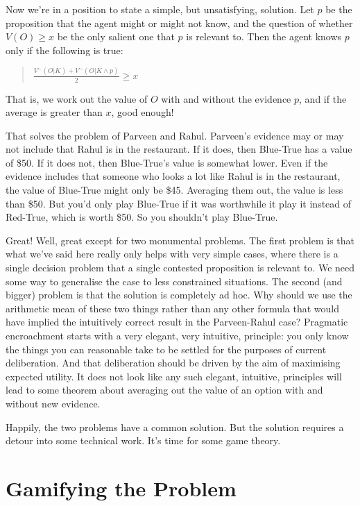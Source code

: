 \documentclass{article}
\begin{document}
Now we're in a position to state a simple, but unsatisfying, solution. Let $p$ be the proposition that the agent might or might not know, and the question of whether $V(O) \geq x$ be the only salient one that $p$ is relevant to. Then the agent knows $p$ only if the following is true:

\begin{quote}

$\frac{V^-(O | K) + V^-(O | K \wedge p)}{2} \geq x$
\end{quote}
That is, we work out the value of $O$ with and without the evidence $p$, and if the average is greater than $x$, good enough!

That solves the problem of Parveen and Rahul. Parveen's evidence may or may not include that Rahul is in the restaurant. If it does, then Blue-True has a value of \$50. If it does not, then Blue-True's value is somewhat lower. Even if the evidence includes that someone who looks a lot like Rahul is in the restaurant, the value of Blue-True might only be \$45. Averaging them out, the value is less than \$50. But you'd only play Blue-True if it was worthwhile it play it instead of Red-True, which is worth \$50. So you shouldn't play Blue-True.

Great! Well, great except for two monumental problems. The first problem is that what we've said here really only helps with very simple cases, where there is a single decision problem that a single contested proposition is relevant to. We need some way to generalise the case to less constrained situations. The second (and bigger) problem is that the solution is completely ad hoc. Why should we use the arithmetic mean of these two things rather than any other formula that would have implied the intuitively correct result in the Parveen-Rahul case? Pragmatic encroachment starts with a very elegant, very intuitive, principle: you only know the things you can reasonable take to be settled for the purposes of current deliberation. And that deliberation should be driven by the aim of maximising expected utility. It does not look like any such elegant, intuitive, principles will lead to some theorem about averaging out the value of an option with and without new evidence.

Happily, the two problems have a common solution. But the solution requires a detour into some technical work. It's time for some game theory.

\section{Gamifying the Problem}
\label{gamifyingtheproblem}
\end{document}
